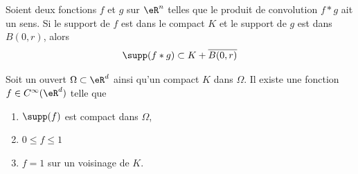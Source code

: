 \begin{proposition}		\label{PROPooQWNNooHmHRbk}
	Soient deux fonctions \( f\) et \( g\) sur \( \eR^n\) telles que le produit de convolution \( f*g\) ait un sens. Si le support de \( f\) est dans le compact \( K\) et le support de \( g\) est dans \( B(0,r)\), alors
	\begin{equation}
		\supp(f*g)\subset K+\overline{B(0,r)}
	\end{equation}
\end{proposition}

\begin{proposition}       \label{PROPooBOZIooAhKbPs}
	Soit un ouvert \( \Omega\subset \eR^d\) ainsi qu'un compact \( K\) dans \( \Omega\). Il existe une fonction \( f\in C^{\infty}(\eR^d)\) telle que
	\begin{enumerate}
		\item
		      \( \supp(f)\) est compact dans \( \Omega\),
		\item
		      \( 0\leq f\leq 1\)
		\item
		      \( f=1\) sur un voisinage de \( K\).
	\end{enumerate}
\end{proposition}

